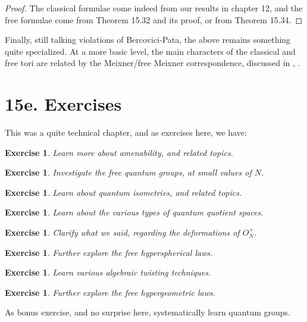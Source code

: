 \documentclass[12pt]{amsbook}
\newtheorem{exercise}[theorem]{Exercise}
\begin{document}
\begin{proof}
The classical formulae come indeed from our results in chapter 12, and the free formulae come from Theorem 15.32 and its proof, or from Theorem 15.34.
\end{proof}

Finally, still talking violations of Bercovici-Pata, the above remains something quite specialized. At a more basic level, the main characters of the classical and free tori are related by the Meixner/free Meixner correspondence, discussed in \cite{ans}, \cite{bwy}.

\section*{15e. Exercises}

This was a quite technical chapter, and as exercises here, we have:

\begin{exercise}
Learn more about amenability, and related topics.
\end{exercise}

\begin{exercise}
Investigate the free quantum groups, at small values of $N$.
\end{exercise}

\begin{exercise}
Learn about quantum isometries, and related topics.
\end{exercise}

\begin{exercise}
Learn about the various types of quantum quotient spaces.
\end{exercise}

\begin{exercise}
Clarify what we said, regarding the deformations of $O_N^+$.
\end{exercise}

\begin{exercise}
Further explore the free hyperspherical laws.
\end{exercise}

\begin{exercise}
Learn various algebraic twisting techniques.
\end{exercise}

\begin{exercise}
Further explore the free hypergeometric laws.
\end{exercise}

As bonus exercise, and no surprise here, systematically learn quantum groups.
\end{document}
